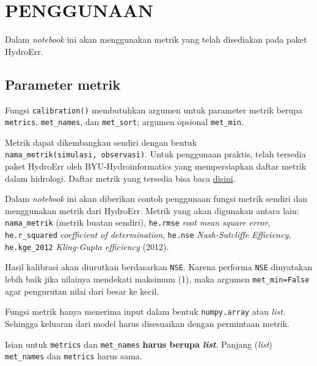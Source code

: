 \documentclass[11pt]{article}
\begin{document}
    \hypertarget{penggunaan}{%
\section{PENGGUNAAN}\label{penggunaan}}

Dalam \emph{notebook} ini akan menggunakan metrik yang telah disediakan
pada paket HydroErr.

    \hypertarget{parameter-metrik}{%
\subsection{Parameter metrik}\label{parameter-metrik}}

Fungsi \texttt{calibration()} membutuhkan argumen untuk parameter metrik
berupa \texttt{metrics}, \texttt{met\_names}, dan \texttt{met\_sort};
argumen opsional \texttt{met\_min}.

Metrik dapat dikembangkan sendiri dengan bentuk
\texttt{nama\_metrik(simulasi,\ observasi)}. Untuk penggunaan praktis,
telah tersedia paket HydroErr oleh BYU-Hydroinformatics yang
mempersiapkan daftar metrik dalam hidrologi. Daftar metrik yang tersedia
bisa baca
\href{https://hydroerr.readthedocs.io/en/stable/list_of_metrics.html}{disini}.

Dalam \emph{notebook} ini akan diberikan contoh penggunaan fungsi metrik
sendiri dan menggunakan metrik dari HydroErr. Metrik yang akan digunakan
antara lain: \texttt{nama\_metrik} (metrik buatan sendiri),
\texttt{he.rmse} \emph{root mean square error}, \texttt{he.r\_squared}
\emph{coefficient of determination}, \texttt{he.nse}
\emph{Nash-Sutcliffe Efficiency}, \texttt{he.kge\_2012}
\emph{Kling-Gupta efficiency} (2012).

Hasil kalibrasi akan diurutkan berdasarkan \texttt{NSE}. Karena performa
\texttt{NSE} dinyatakan lebih baik jika nilainya mendekati maksimum (1),
maka argumen \texttt{met\_min=False} agar pengurutan nilai dari besar ke
kecil.

Fungsi metrik hanya menerima input dalam bentuk \texttt{numpy.array}
atau \emph{list}. Sehingga keluaran dari model harus disesuaikan dengan
permintaan metrik.

Isian untuk \texttt{metrics} dan \texttt{met\_names} \textbf{harus
berupa \emph{list}}. Panjang (\emph{list}) \texttt{met\_names} dan
\texttt{metrics} harus sama.
\end{document}

